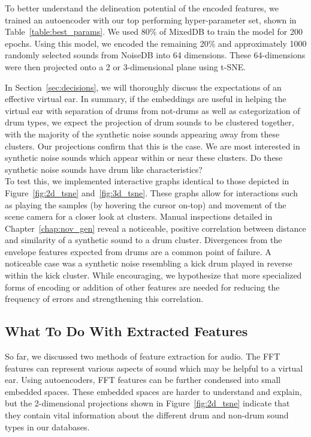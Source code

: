 \documentclass[\main/thesis.tex]{subfiles}
\begin{document}
To better understand the delineation potential of the encoded features,  we trained an autoencoder with our top performing hyper-parameter set, shown in Table~\ref{table:best_params}. We used 80\% of MixedDB to train the model for 200 epochs. Using this model, we encoded the remaining 20\% and approximately 1000 randomly selected sounds from NoiseDB into 64 dimensions. These 64-dimensions were then projected onto a 2 or 3-dimensional plane using t-SNE. 

In Section~\ref{sec:decisions}, we will thoroughly discuss the expectations of an effective virtual ear. In summary, if the embeddings are useful in helping the virtual ear with separation of drums from not-drums as well as categorization of drum types, we expect the projection of drum sounds to be clustered together, with the majority of the synthetic noise sounds appearing away from these clusters. Our projections confirm that this is the case. We are most interested in synthetic noise sounds which appear within or near these clusters. Do these synthetic noise sounds have drum like characteristics?\\ 

To test this, we implemented interactive graphs identical to those depicted in Figure~\ref{fig:2d_tsne} and~\ref{fig:3d_tsne}. These graphs allow for interactions such as playing the samples (by hovering the cursor on-top) and movement of the scene camera for a closer look at clusters.  Manual inspections detailed in Chapter~\ref{chap:nov_gen} reveal a noticeable, positive correlation between distance and similarity of a synthetic sound to a drum cluster. Divergences from the envelope features expected from drums are a common point of failure. A noticeable case was a synthetic noise resembling a kick drum played in reverse within the kick cluster. While encouraging, we hypothesize that more specialized forms of encoding or addition of other features are needed for reducing the frequency of errors and strengthening this correlation.
\subsection{What To Do With Extracted Features}
\label{sec:howto_use_features}
So far, we discussed two methods of feature extraction for audio. The FFT features can represent various aspects of sound which may be helpful to a virtual ear. Using autoencoders, FFT features can be further condensed into small embedded spaces. These embedded spaces are harder to understand and explain, but the 2-dimensional projections shown in Figure~\ref{fig:2d_tsne}  indicate that they contain vital information about the different drum and non-drum sound types in our databases. 
\end{document}

